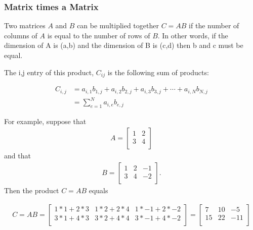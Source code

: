     
    \hypertarget{matrix-times-a-matrix}{%
\subsubsection{Matrix times a Matrix}\label{matrix-times-a-matrix}}

Two matrices \(A\) and \(B\) can be multiplied together \(C = AB\) if
the number of columns of \(A\) is equal to the number of rows of \(B\).
In other words, if the dimension of A is (a,b) and the dimension of B is
(c,d) then b and c must be equal.

The i,j entry of this product, \(C_{ij}\) is the following sum of
products:

\begin{align}
    C_{i,j} &= a_{i,1}b_{1,j} + a_{i,2}b_{2,j} + a_{i,3}b_{3,j} + \cdots + a_{i,N}b_{N,j}\\
            &= \sum_{e=1}^{N} a_{i,e}b_{e,j}
\end{align}

For example, suppose that \begin{align}
    A = \left [ \begin{matrix}
                     1 & 2\\
                     3 & 4 \\
                 \end{matrix} \right] 
\end{align} and that \begin{align}
    B = \left [ \begin{matrix}
                     1 & 2 & -1\\
                     3 & 4 & -2 \\
                 \end{matrix} \right] . 
\end{align} Then the product \(C = AB\) equals

\begin{align}
    C = AB = \left [ \begin{matrix}
                            1*1 + 2*3 & 1*2 + 2*4 & 1*-1 + 2*-2 \\
                            3*1 + 4*3 & 3*2 + 4*4 & 3*-1 + 4*-2 \\
                      \end{matrix} \right] = 
                    \left [ \begin{matrix}
                            7 & 10 & -5 \\
                            15 & 22 & -11 \\
                      \end{matrix} \right] 
\end{align}

